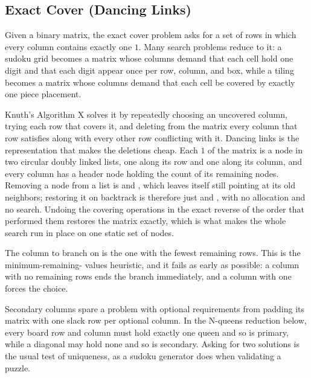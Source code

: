 \subsection{Exact Cover (Dancing Links)}
\label{sec:1.8.8}
Given a binary matrix, the exact cover problem asks for a set of rows in which every column contains exactly one $1$. Many search problems reduce to it: a sudoku grid becomes a matrix whose columns demand that each cell hold one digit and that each digit appear once per row, column, and box, while a tiling becomes a matrix whose columns demand that each cell be covered by exactly one piece placement.

Knuth's Algorithm X solves it by repeatedly choosing an uncovered column, trying each row that covers it, and deleting from the matrix every column that row satisfies along with every other row conflicting with it. Dancing links is the representation that makes the deletions cheap. Each $1$ of the matrix is a node in two circular doubly linked lists, one along its row and one along its column, and every column has a header node holding the count of its remaining nodes. Removing a node  from a list is  and , which leaves  itself still pointing at its old neighbors; restoring it on backtrack is therefore just  and , with no allocation and no search. Undoing the covering operations in the exact reverse of the order that performed them restores the matrix exactly, which is what makes the whole search run in place on one static set of nodes.

The column to branch on is the one with the fewest remaining rows. This is the minimum-remaining- values heuristic, and it fails as early as possible: a column with no remaining rows ends the branch immediately, and a column with one forces the choice.

Secondary columns spare a problem with optional requirements from padding its matrix with one slack row per optional column. In the N-queens reduction below, every board row and column must hold exactly one queen and so is primary, while a diagonal may hold none and so is secondary. Asking for two solutions is the usual test of uniqueness, as a sudoku generator does when validating a puzzle.

